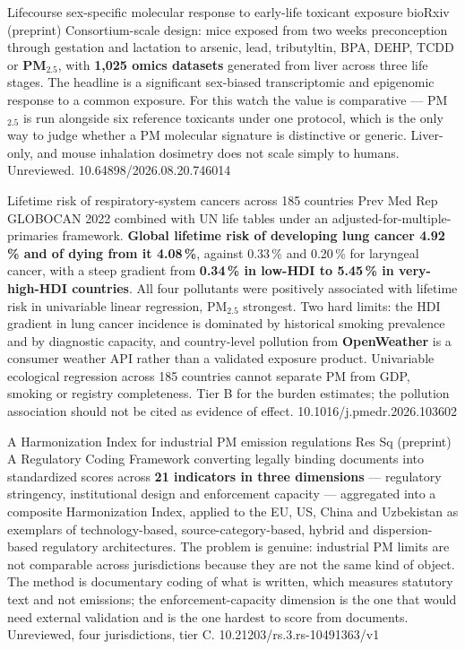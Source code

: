 \documentclass[10pt]{article}
\begin{document}
{Lifecourse sex-specific molecular response to early-life toxicant exposure}
{bioRxiv (preprint)}
{Consortium-scale design: mice exposed from two weeks preconception through gestation and
lactation to arsenic, lead, tributyltin, BPA, DEHP, TCDD or \textbf{PM$_{2.5}$}, with
\textbf{1,025 omics datasets} generated from liver across three life stages. The
headline is a significant sex-biased transcriptomic and epigenomic response to a common
exposure. For this watch the value is comparative --- PM$_{2.5}$ is run alongside six
reference toxicants under one protocol, which is the only way to judge whether a PM
molecular signature is distinctive or generic. Liver-only, and mouse inhalation dosimetry
does not scale simply to humans. Unreviewed.}
{10.64898/2026.08.20.746014}


{Lifetime risk of respiratory-system cancers across 185 countries}
{Prev Med Rep}
{GLOBOCAN 2022 combined with UN life tables under an adjusted-for-multiple-primaries
framework. \textbf{Global lifetime risk of developing lung cancer 4.92\,\% and of dying
from it 4.08\,\%}, against 0.33\,\% and 0.20\,\% for laryngeal cancer, with a steep
gradient from \textbf{0.34\,\% in low-HDI to 5.45\,\% in very-high-HDI countries}. All
four pollutants were positively associated with lifetime risk in univariable linear
regression, PM$_{2.5}$ strongest. Two hard limits: the HDI gradient in lung cancer
incidence is dominated by historical smoking prevalence and by diagnostic capacity, and
country-level pollution from \textbf{OpenWeather} is a consumer weather API rather than a
validated exposure product. Univariable ecological regression across 185 countries
cannot separate PM from GDP, smoking or registry completeness. Tier B for the burden
estimates; the pollution association should not be cited as evidence of effect.}
{10.1016/j.pmedr.2026.103602}

{A Harmonization Index for industrial PM emission regulations}
{Res Sq (preprint)}
{A Regulatory Coding Framework converting legally binding documents into standardized
scores across \textbf{21 indicators in three dimensions} --- regulatory stringency,
institutional design and enforcement capacity --- aggregated into a composite
Harmonization Index, applied to the EU, US, China and Uzbekistan as exemplars of
technology-based, source-category-based, hybrid and dispersion-based regulatory
architectures. The problem is genuine: industrial PM limits are not comparable across
jurisdictions because they are not the same kind of object. The method is documentary
coding of what is written, which measures statutory text and not emissions; the
enforcement-capacity dimension is the one that would need external validation and is the
one hardest to score from documents. Unreviewed, four jurisdictions, tier C.}
{10.21203/rs.3.rs-10491363/v1}
\end{document}
